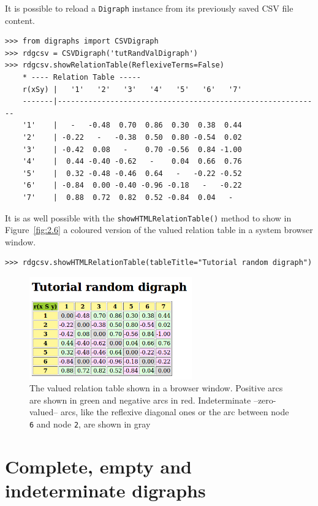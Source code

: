 It is possible to reload a \texttt{Digraph} instance from its previously saved CSV file content.
\begin{lstlisting} 
>>> from digraphs import CSVDigraph   
>>> rdgcsv = CSVDigraph('tutRandValDigraph')
>>> rdgcsv.showRelationTable(ReflexiveTerms=False)
    * ---- Relation Table -----
    r(xSy) |   '1'   '2'   '3'   '4'   '5'   '6'   '7'	  
    -------|------------------------------------------------------------
    '1'    |   -   -0.48  0.70  0.86  0.30  0.38  0.44	 
    '2'    | -0.22   -   -0.38  0.50  0.80 -0.54  0.02	 
    '3'    | -0.42  0.08   -    0.70 -0.56  0.84 -1.00	 
    '4'    |  0.44 -0.40 -0.62   -    0.04  0.66  0.76	 
    '5'    |  0.32 -0.48 -0.46  0.64   -   -0.22 -0.52	 
    '6'    | -0.84  0.00 -0.40 -0.96 -0.18   -   -0.22	 
    '7'    |  0.88  0.72  0.82  0.52 -0.84  0.04   -
\end{lstlisting}
  
It is as well possible with the \texttt{showHTMLRelationTable()} method to show in Figure~\vref{fig:2.6} a coloured version of the valued relation table in a system browser window. 
\begin{lstlisting}
>>> rdgcsv.showHTMLRelationTable(tableTitle="Tutorial random digraph")
\end{lstlisting}
 \begin{figure}[ht]
\sidecaption[t]
\includegraphics[width=7cm]{Figures/2-6-htmlTutorialDigraph.png}
\caption[The valued relation table shown in a browser window]{The valued relation table shown in a browser window. Positive arcs are shown in green and negative arcs in red. Indeterminate --zero-valued-- arcs, like the reflexive diagonal ones or the arc between node \texttt{6} and node \texttt{2}, are shown in gray}
\label{fig:2.6}       %
\end{figure}
 
\section{Complete, empty and indeterminate digraphs}
\label{sec:2.10}

